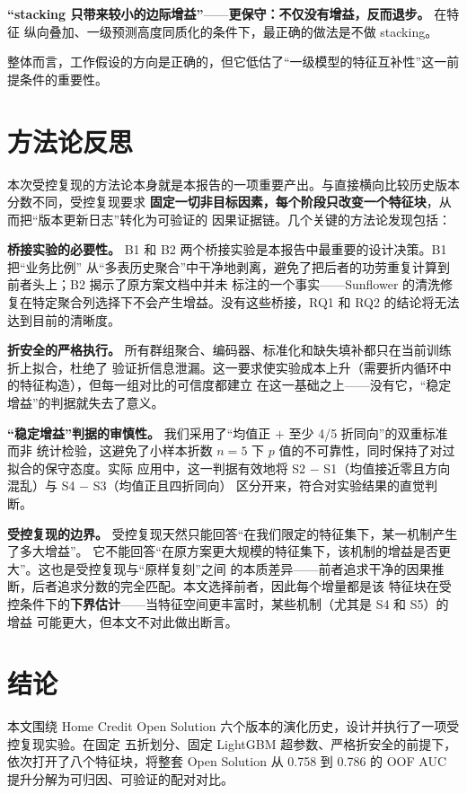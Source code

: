 \documentclass[11pt,UTF8,fontset=windows]{ctexrep}
\begin{document}
\textbf{“stacking 只带来较小的边际增益”}——\textbf{更保守：不仅没有增益，反而退步。} 在特征
纵向叠加、一级预测高度同质化的条件下，最正确的做法是不做 stacking。

整体而言，工作假设的方向是正确的，但它低估了“一级模型的特征互补性”这一前提条件的重要性。

\section{方法论反思}

本次受控复现的方法论本身就是本报告的一项重要产出。与直接横向比较历史版本分数不同，受控复现要求
\textbf{固定一切非目标因素，每个阶段只改变一个特征块}，从而把“版本更新日志”转化为可验证的
因果证据链。几个关键的方法论发现包括：

\textbf{桥接实验的必要性。} B1 和 B2 两个桥接实验是本报告中最重要的设计决策。B1 把“业务比例”
从“多表历史聚合”中干净地剥离，避免了把后者的功劳重复计算到前者头上；B2 揭示了原方案文档中并未
标注的一个事实——Sunflower 的清洗修复在特定聚合列选择下不会产生增益。没有这些桥接，RQ1 和
RQ2 的结论将无法达到目前的清晰度。

\textbf{折安全的严格执行。} 所有群组聚合、编码器、标准化和缺失填补都只在当前训练折上拟合，杜绝了
验证折信息泄漏。这一要求使实验成本上升（需要折内循环中的特征构造），但每一组对比的可信度都建立
在这一基础之上——没有它，“稳定增益”的判据就失去了意义。

\textbf{“稳定增益”判据的审慎性。} 我们采用了“均值正 $+$ 至少 4/5 折同向”的双重标准而非
统计检验，这避免了小样本折数 $n=5$ 下 $p$ 值的不可靠性，同时保持了对过拟合的保守态度。实际
应用中，这一判据有效地将 S2 $-$ S1（均值接近零且方向混乱）与 S4 $-$ S3（均值正且四折同向）
区分开来，符合对实验结果的直觉判断。

\textbf{受控复现的边界。} 受控复现天然只能回答“在我们限定的特征集下，某一机制产生了多大增益”。
它不能回答“在原方案更大规模的特征集下，该机制的增益是否更大”。这也是受控复现与“原样复刻”之间
的本质差异——前者追求干净的因果推断，后者追求分数的完全匹配。本文选择前者，因此每个增量都是该
特征块在受控条件下的\textbf{下界估计}——当特征空间更丰富时，某些机制（尤其是 S4 和 S5）的增益
可能更大，但本文不对此做出断言。

\section{结论}

本文围绕 Home Credit Open Solution 六个版本的演化历史，设计并执行了一项受控复现实验。在固定
五折划分、固定 LightGBM 超参数、严格折安全的前提下，依次打开了八个特征块，将整套 Open Solution
从 0.758 到 0.786 的 OOF AUC 提升分解为可归因、可验证的配对对比。
\end{document}
